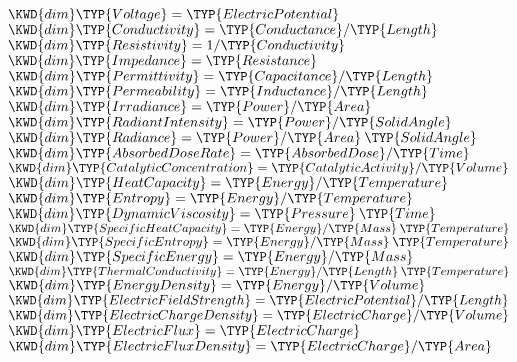\begin{Fortress}
\( \KWD{dim} \TYP{Voltage} = \TYP{ElectricPotential}\)\\
\( \KWD{dim} \TYP{Conductivity} = \TYP{Conductance} / \TYP{Length}\)\\
\( \KWD{dim} \TYP{Resistivity} = 1 / \TYP{Conductivity}\)\\
\( \KWD{dim} \TYP{Impedance} = \TYP{Resistance}\)\\
\( \KWD{dim} \TYP{Permittivity} = \TYP{Capacitance} / \TYP{Length}\)\\
\( \KWD{dim} \TYP{Permeability} = \TYP{Inductance} / \TYP{Length}\)\\
\( \KWD{dim} \TYP{Irradiance} = \TYP{Power} / \TYP{Area}\)\\
\( \KWD{dim} \TYP{RadiantIntensity} = \TYP{Power} / \TYP{SolidAngle}\)\\
\( \KWD{dim} \TYP{Radiance} = \TYP{Power} / \TYP{Area}\mskip 4mu plus 4mu\TYP{SolidAngle}\)\\
\( \KWD{dim} \TYP{AbsorbedDoseRate} = \TYP{AbsorbedDose} / \TYP{Time}\)\\
\( \KWD{dim} \TYP{CatalyticConcentration} = \TYP{CatalyticActivity} / \TYP{Volume}\)\\
\( \KWD{dim} \TYP{HeatCapacity} = \TYP{Energy} / \TYP{Temperature}\)\\
\( \KWD{dim} \TYP{Entropy} = \TYP{Energy} / \TYP{Temperature}\)\\
\( \KWD{dim} \TYP{DynamicViscosity} = \TYP{Pressure}\mskip 4mu plus 4mu\TYP{Time}\)\\
\( \KWD{dim} \TYP{SpecificHeatCapacity} = \TYP{Energy} / \TYP{Mass}\mskip 4mu plus 4mu\TYP{Temperature}\)\\
\( \KWD{dim} \TYP{SpecificEntropy} = \TYP{Energy} / \TYP{Mass}\mskip 4mu plus 4mu\TYP{Temperature}\)\\
\( \KWD{dim} \TYP{SpecificEnergy} = \TYP{Energy} / \TYP{Mass}\)\\
\( \KWD{dim} \TYP{ThermalConductivity} = \TYP{Energy} / \TYP{Length}\mskip 4mu plus 4mu\TYP{Temperature}\)\\
\( \KWD{dim} \TYP{EnergyDensity} = \TYP{Energy} / \TYP{Volume}\)\\
\( \KWD{dim} \TYP{ElectricFieldStrength} = \TYP{ElectricPotential} / \TYP{Length}\)\\
\( \KWD{dim} \TYP{ElectricChargeDensity} = \TYP{ElectricCharge} / \TYP{Volume}\)\\
\( \KWD{dim} \TYP{ElectricFlux} = \TYP{ElectricCharge}\)\\
\( \KWD{dim} \TYP{ElectricFluxDensity} = \TYP{ElectricCharge} / \TYP{Area}\)\\

\end{Fortress}
